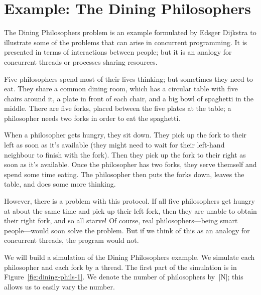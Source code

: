 \section{Example: The Dining Philosophers}

The Dining Philosophers problem is an example formulated by Edsger Dijkstra
to illustrate some of the problems that can arise in concurrent programming.  
It is presented in terms of interactions between people; but it is an analogy
for concurrent threads or processes sharing resources. 

Five philosophers spend most of their lives thinking; but sometimes they need
to eat.  They share a common dining room, which has a circular table with five
chairs around it, a plate in front of each chair, and a big bowl of spaghetti
in the middle.  There are five forks, placed between the five plates at the
table; a philosopher needs two forks in order to eat the spaghetti. 

When a philosopher gets hungry, they sit down.  They pick up the fork to their
left as soon as it's available (they might need to wait for their left-hand
neighbour to finish with the fork).  Then they pick up the fork to their right
as soon as it's available.  Once the philosopher has two forks, they serve
themself and spend some time eating.  The philosopher then puts the forks
down, leaves the table, and does some more thinking.

However, there is a problem with this protocol.  If all five philosophers get
hungry at about the same time and pick up their left fork, then they are
unable to obtain their right fork, and so all starve!  Of course, real
philosophers---being smart people---would soon solve the problem.  But if we
think of this as an analogy for concurrent threads, the program would not.

We will build a simulation of the Dining Philosophers example.  We 
simulate each philosopher and each fork by a thread.  The first part of the
simulation is in Figure~\ref{fig:dining-phils-1}.  We denote the number of
philosophers by~|N|; this allows us to easily vary the number. 


